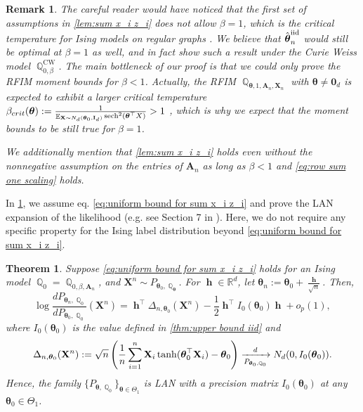 \documentclass[preprint,reqno]{imsart}
\newtheorem{thm}{Theorem}[section]
\newtheorem{remark}{Remark}[section]
\newcommand{\ttheta}{\boldsymbol{\theta}}
\newcommand{\I}{\mathbf{I}_{\mathnormal{d}}}
\DeclareMathOperator{\bh}{\textbf{h}}
\DeclareMathOperator{\sech}{sech}
\DeclareMathOperator{\EE}{\mathbb{E}}
\DeclareMathOperator{\QQ}{\mathbb{Q}}
\newcommand{\A}{\mathbf{A}}
\newcommand{\X}{\mathbf{X}}
\DeclareMathOperator{\sumin}{\sum_{\mathnormal i=1}^{\mathnormal n}}
\newcommand{\thetaiid}{\hat{\boldsymbol \theta}^{\text{iid}}_{\mathnormal n}}
\begin{document}
\begin{remark}%
    The careful reader would have noticed that the first set of assumptions in \cref{lem:sum x_i z_i} does not allow $\beta = 1$, which is the critical temperature for Ising models on regular graphs \citep{deb2023fluctuations}. We believe that $\thetaiid$ would still be optimal at $\beta = 1$ as well, and in fact show such a result under the Curie Weiss model $\QQ_{0,\beta}^{\text{CW}}$. The main bottleneck of our proof is that we could only prove the RFIM moment bounds for $\beta < 1$. Actually, the RFIM $\QQ_{\ttheta, 1, \A_n,\X_n}$ with $\ttheta \neq \mathbf{0}_d$ is expected to exhibit a larger critical temperature $\beta_{crit}(\ttheta) := \frac{1}{\EE_{\X \sim N_d(\ttheta_0, \I)} \sech^2(\ttheta^\top X)} > 1$ \citep{he2023hidden}, which is why we expect that the moment bounds to be still true for $\beta = 1$.

    We additionally mention that \cref{lem:sum x_i z_i} holds even without the nonnegative assumption on the entries of $\A_n$ as long as $\beta < 1$ and \eqref{eq:row sum one scaling} holds.
\end{remark}

In \cref{thm:lower bound high temperature}, we assume eq. \eqref{eq:uniform bound for sum x_i z_i} and prove the LAN expansion of the likelihood (e.g. see Section 7 in \cite{van2000asymptotic}). 
Here, we do not require any specific property for the Ising label distribution beyond \eqref{eq:uniform bound for sum x_i z_i}.

\begin{thm}\label{thm:lower bound high temperature}
    Suppose \eqref{eq:uniform bound for sum x_i z_i} holds for an Ising model $\QQ_0 = \QQ_{0,\beta,\A_n}$, and $\X^n \sim P_{\ttheta_0,\QQ_{\ttheta}}$. For $\bh\in \mathbb{R}^d$, let $\ttheta_n := \ttheta_0+\frac{\bh}{\sqrt{n}}$. Then,
    $$\log \frac{dP_{\ttheta_n,\QQ_{0}}}{dP_{\ttheta_0, \QQ_{0}}} (\X^n) = \bh^\top \Delta_{n, \ttheta_0}(\X^n)- \frac{1}{2} \bh^\top I_0(\ttheta_0) \bh + o_p(1),$$
    where $I_{0}(\ttheta_0)$ is the value defined in \cref{thm:upper bound iid} and
    \begin{equation}\label{eq:delta_n}
        \Delta_{n, \ttheta_0}(\X^n) := \sqrt{n} \left(\frac{1}{n} \sumin \X_i \tanh(\ttheta_0^\top \X_i) - \ttheta_0 \right) \xrightarrow[P_{\ttheta_0, \QQ_{0}}]{d} N_d(0, I_{0}(\ttheta_0)).
    \end{equation}
    Hence, the family $\{P_{\ttheta,\QQ_{0}} \}_{\ttheta\in \Theta_1}$ is LAN with a precision matrix $I_0(\ttheta_0)$ at any $\ttheta_0 \in \Theta_1$.
\end{thm}
\end{document}
